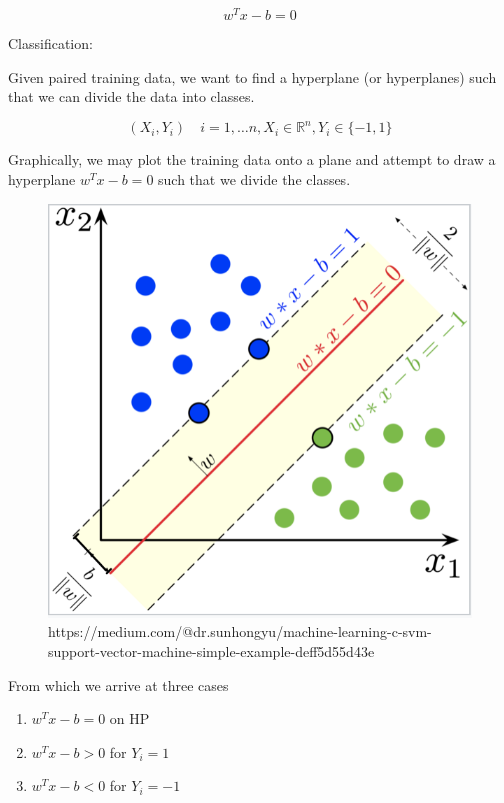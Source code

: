 \documentclass[10pt]{article}
\begin{document}
\begin{equation}
	w^Tx -b =0
	\label{eq:286:hyperplane}
\end{equation}

Classification:

Given paired training data, we want to find a hyperplane (or hyperplanes) such that we can divide the data into classes.

\begin{equation}
	(X_i, Y_i) \quad i = 1, \ldots n, X_i \in \mathbb{R}^n, Y_i \in \{-1, 1\}
\end{equation}

Graphically, we may plot the training data onto a plane and attempt to draw a hyperplane $ w^Tx-b =0 $ such that we divide the classes.

\begin{figure}[H]
	\centering
	\includegraphics[width=0.8\linewidth]{img/image_2022-04-08-15-21-41.png}
	\caption{https://medium.com/@dr.sunhongyu/machine-learning-c-svm-support-vector-machine-simple-example-deff5d55d43e}
\end{figure}

From which we arrive at three cases


\begin{enumerate}
	\item $w^Tx - b =0 $ on HP
	\item $w^Tx - b > 0 $ for $ Y_i = 1 $ 
	\item $w^Tx - b < 0 $ for $ Y_i = -1 $ 
\end{enumerate}
\end{document}
